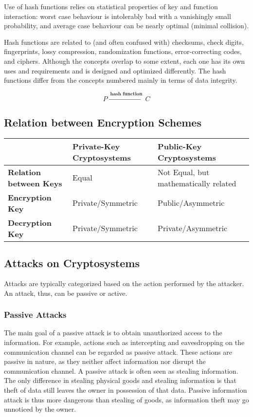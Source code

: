 \documentclass[british]{article}
\providecommand{\tabularnewline}{\\}
\begin{document}
Use of hash functions relies on statistical properties of key and
function interaction: worst case behaviour is intolerably bad with
a vanishingly small probability, and average case behaviour can be
nearly optimal (minimal collision).

Hash functions are related to (and often confused with) checksums,
check digits, fingerprints, lossy compression, randomization functions,
error-correcting codes, and ciphers. Although the concepts overlap
to some extent, each one has its own uses and requirements and is
designed and optimized differently. The hash functions differ from
the concepts numbered mainly in terms of data integrity. 

$$ P\xrightarrow{\:\textbf{hash function}\:}C $$

\subsection{Relation between Encryption Schemes}
\begin{center}
\begin{tabular}{|l||l|l|}
\hline 
 & \textbf{Private-Key Cryptosystems} & \textbf{Public-Key Cryptosystems}\tabularnewline
\hline 
\hline 
\textbf{Relation between Keys} & Equal & Not Equal, but mathematically related\tabularnewline
\hline 
\textbf{Encryption Key} & Private/Symmetric & Public/Asymmetric\tabularnewline
\hline 
\textbf{Decryption Key} & Private/Symmetric & Private/Asymmetric\tabularnewline
\hline 
\end{tabular}
\par\end{center}

\subsection{Attacks on Cryptosystems}

Attacks are typically categorized based on the action performed by
the attacker. An attack, thus, can be passive or active.

\subsubsection{Passive Attacks}

The main goal of a passive attack is to obtain unauthorized access
to the information. For example, actions such as intercepting and
eavesdropping on the communication channel can be regarded as passive
attack. These actions are passive in nature, as they neither affect
information nor disrupt the communication channel. A passive attack
is often seen as stealing information. The only difference in stealing
physical goods and stealing information is that theft of data still
leaves the owner in possession of that data. Passive information attack
is thus more dangerous than stealing of goods, as information theft
may go unnoticed by the owner.
\end{document}
